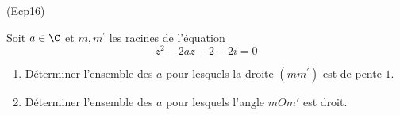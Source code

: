 \begin{tiny}(Ecp16)\end{tiny}
Soit $a\in \C$ et $m,m^{\prime }$ les racines de l'équation
\begin{displaymath}
z^{2}-2az-2-2i=0  
\end{displaymath}
\begin{enumerate}
  \item Déterminer l'ensemble des $a$ pour lesquels la droite $(mm^{\prime })$ est de pente $1$.
  \item Déterminer l'ensemble des $a$ pour lesquels l'angle $mOm'$ est droit.
\end{enumerate}

  